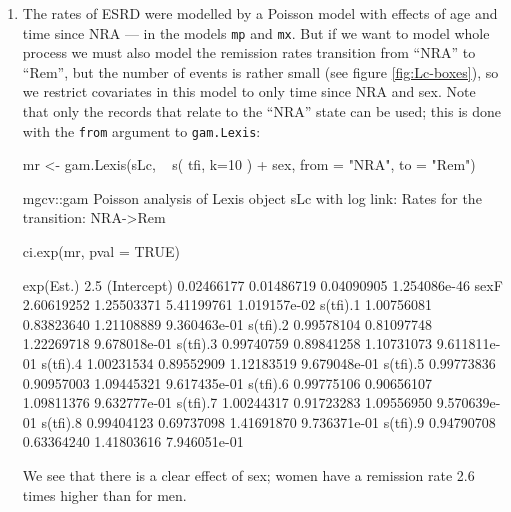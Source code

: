 \begin{enumerate}[resume]
\item The rates of ESRD were modelled by a Poisson model with effects
  of age and time since NRA --- in the models \texttt{mp} and
  \texttt{mx}.  But if we want to model whole process we must also
  model the remission rates transition from ``NRA'' to ``Rem'', but
  the number of events is rather small (see figure
  \ref{fig:Lc-boxes}), so we restrict covariates in this model to only time since
  NRA and sex. Note that only the records that relate to the ``NRA'' state
  can be used; this is done with the \texttt{from} argument to \texttt{gam.Lexis}:
\begin{Schunk}
\begin{Sinput}
 mr <- gam.Lexis(sLc, ~ s( tfi, k=10 ) + sex,
                      from = "NRA", 
                        to = "Rem")
\end{Sinput}
\begin{Soutput}
mgcv::gam Poisson analysis of Lexis object sLc with log link:
Rates for the transition:
NRA->Rem
\end{Soutput}
\begin{Sinput}
 ci.exp(mr, pval = TRUE)
\end{Sinput}
\begin{Soutput}
             exp(Est.)       2.5%      97.5%            P
(Intercept) 0.02466177 0.01486719 0.04090905 1.254086e-46
sexF        2.60619252 1.25503371 5.41199761 1.019157e-02
s(tfi).1    1.00756081 0.83823640 1.21108889 9.360463e-01
s(tfi).2    0.99578104 0.81097748 1.22269718 9.678018e-01
s(tfi).3    0.99740759 0.89841258 1.10731073 9.611811e-01
s(tfi).4    1.00231534 0.89552909 1.12183519 9.679048e-01
s(tfi).5    0.99773836 0.90957003 1.09445321 9.617435e-01
s(tfi).6    0.99775106 0.90656107 1.09811376 9.632777e-01
s(tfi).7    1.00244317 0.91723283 1.09556950 9.570639e-01
s(tfi).8    0.99404123 0.69737098 1.41691870 9.736371e-01
s(tfi).9    0.94790708 0.63364240 1.41803616 7.946051e-01
\end{Soutput}
\end{Schunk}
We see that there is a clear effect of sex; women have a remission
rate 2.6 times higher than for men.


\end{enumerate}
